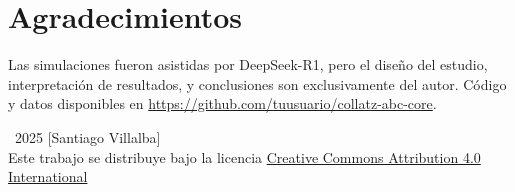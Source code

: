\documentclass[12pt]{article}
\begin{document}
  
\printbibliography  

\section*{Agradecimientos}
Las simulaciones fueron asistidas por DeepSeek-R1, pero el diseño del estudio, interpretación de resultados, y conclusiones son exclusivamente del autor. Código y datos disponibles en \url{https://github.com/tuusuario/collatz-abc-core}.

\vspace*{\fill}
\begin{center}
\footnotesize
\textcopyright\ 2025 [Santiago Villalba] \\
Este trabajo se distribuye bajo la licencia \href{https://creativecommons.org/licenses/by/4.0/}{Creative Commons Attribution 4.0 International} \\
\ccby
\end{center}
\end{document}
